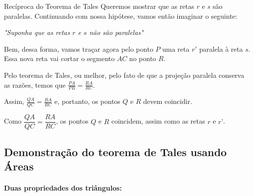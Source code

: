 \begin{task}{Recíproca do Teorema de Tales}
Queremos mostrar que as retas $r$ e $s$ são paralelas. Continuando com nossa hipótese, vamos então imaginar o seguinte:

\textit{"Suponha que as retas $r$ e $s$ não são paralelas"}

Bem, dessa forma, vamos traçar agora pelo ponto $P$ uma reta $r'$ paralela à reta $s$. Essa nova reta vai cortar o segmento $AC$ no ponto $R$.

Pelo teorema de Tales, ou melhor, pelo fato de que a projeção paralela conserva as razões, temos que $\frac{PA}{PB}=\frac{RA}{RC}$.

Assim, $\frac{QA}{QC}=\frac{RA}{RC}$ e, portanto, os pontos $Q$ e $R$ devem coincidir.

Como \(\dfrac{QA}{QC}=\dfrac{RA}{RC}\), os pontos \(Q\) e \(R\) coincidem, assim como as retas \(r\) e \(r’\).

\end{task}


\subsection{Demonstração do teorema de Tales usando Áreas}


\paragraph{Duas propriedades dos triângulos:}

